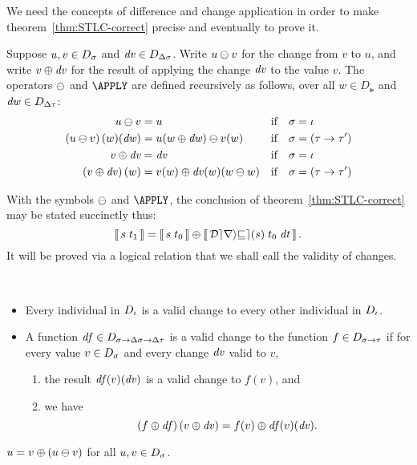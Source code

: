 We need the concepts of difference and change application in
order to make theorem~\ref{thm:STLC-correct} precise and
eventually to prove it.

\begin{definition}
\label{def:diff+apply}
Suppose $u,v\in D_\sigma$ and $\mathit{dv}\in D_{\Delta\sigma}$. Write
$\Diff u v$ for the change from $v$ to $u$, and write
$\Apply{\D v}v$ for the result of applying the change $\mathit{dv}$ to
the value $v$. The operators $\DIFF$ and $\APPLY$ are defined
recursively as follows, over all $w\in D_{\Gt}$ and
$\mathit{dw}\in D_{\Delta\tau}$:
\begin{align*}
\Diff u v &= u
&&\text{if}& \Gs&=\Gi\\
\Diff* u v(w)(\D w) &= \Diff{u(\Apply{\D w}w)}{v(w)}
&&\text{if}& \Gs&=(\Gt\r\Gt')\\
\Apply{\D v}v &= \D v
&&\text{if}& \Gs&=\Gi\\
\Apply*{\D v}v(w) &= \Apply{\D v(w)(\Diff w w)}{v(w)}
&&\text{if}& \Gs&=(\Gt\r\Gt')\\
\end{align*}
\end{definition}

With the symbols $\DIFF$ and $\APPLY$, the conclusion of
theorem~\ref{thm:STLC-correct} may be stated succinctly thus:
\[
\mean{\App s {t_1}} =
\Apply{\mean{\App{\App{\Derive s}{t_0}}{\D t}}}
      {\mean{\App s {t_0}}}.
\]
It will be proved via a logical relation that we shall call the
validity of changes.

\begin{definition}
\label{def:valid-changes}
~ %
\begin{itemize}
\item Every individual in $D_\iota$ is a valid change to every
other individual in $D_\iota$.
\item A function $\mathit{df}\in D_{\sigma\to\Delta\sigma\to\Delta\tau}$ is a valid
change to the function $f\in D_{\sigma\to\tau}$ if for every value
$v\in D_\sigma$ and every change $\mathit{dv}$ valid to $v$,
\begin{enumerate}[(1)]
\item the result $\mathit{df}(v)(\mathit{dv})$ is a valid change to $f(v)$, and
\item we have
\[
\Apply*{\D f}f \Apply*{\D v}v = \Apply{\D f(v)(\D v)}{f(v)}.
\]
\end{enumerate}
\end{itemize}
\end{definition}

\begin{lemma}
\label{lem:apply-diff}
$
u = \Apply{\Diff* u v}v
$
for all $u,v\in D_\sigma$.
\end{lemma}

